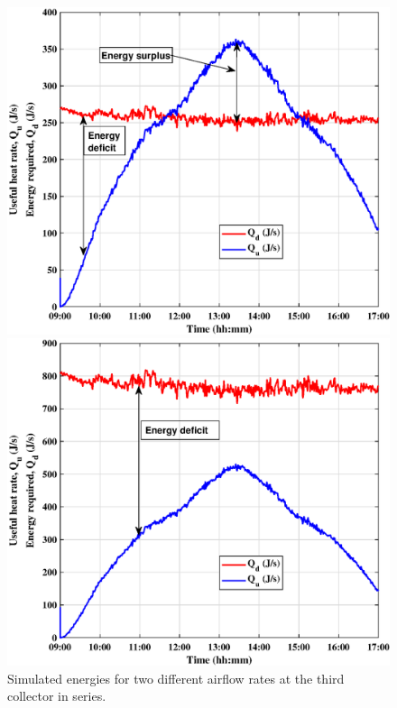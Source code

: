\begin{figure}[ht!]
	\begin{minipage}{0.50\columnwidth}
		\includegraphics[scale=0.45]{figs/dry_low_3col.eps}
		
	\end{minipage}
	\begin{minipage}{0.50\columnwidth}
		\includegraphics[scale=0.45]{figs/dry_high_3col.eps}
		
	\end{minipage}
	\caption{Simulated energies for two different airflow rates at the third collector in series.}
	\label{dry_3col}
\end{figure}

